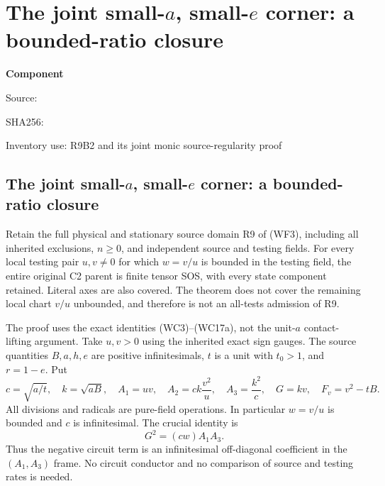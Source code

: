\chapter{The joint small-$a$, small-$e$ corner: a bounded-ratio closure}
\label{component:p26da50239f47}
\noindent\textbf{Component }\par
{\small\noindent Source: \par}
{\small\noindent SHA256: \par}
{\small\noindent Inventory use: R9B2 and its joint monic source-regularity proof\par}
\medskip
\section{The joint small-$a$, small-$e$ corner: a bounded-ratio closure}
\label{p26da50239f47:sec:r14-r9-bounded-ratio}

\begin{theorem}
Retain the full physical and stationary source domain R9 of (WF3),
including all inherited exclusions, $n\ge0$, and independent source
and testing fields. For every local testing pair $u,v\ne0$ for which
$w=v/u$ is bounded in the testing field, the entire original C2 parent
is finite tensor SOS, with every state component retained. Literal
axes are also covered. The theorem does not cover the remaining
local chart $v/u$ unbounded, and therefore is not an all-tests
admission of R9.
\end{theorem}

The proof uses the exact identities (WC3)--(WC17a), not the unit-$a$
contact-lifting argument. Take $u,v>0$ using the inherited exact sign
gauges. The source quantities $B,a,h,e$ are positive infinitesimals,
$t$ is a unit with $t_0>1$, and $r=1-e$. Put
\[
 c=\sqrt{a/t},\quad k=\sqrt{aB},\quad
 A_1=uv,
 \quad A_2=ck\frac{v^2}{u},\quad A_3=\frac{k^2}{c},
 \quad G=kv,\quad F_v=v^2-tB.
\]
All divisions and radicals are pure-field operations. In particular
$w=v/u$ is bounded and $c$ is infinitesimal. The crucial identity is
\[
 \boxed{G^2=(cw)A_1A_3.}                              \tag{R9B1}
\]
Thus the negative circuit term is an infinitesimal off-diagonal
coefficient in the $(A_1,A_3)$ frame. No circuit conductor and no
comparison of source and testing rates is needed.

